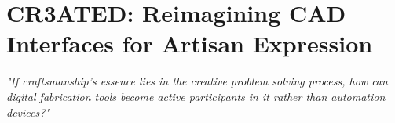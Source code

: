 \section{CR3ATED: Reimagining CAD Interfaces for Artisan Expression}
\textit{"If craftsmanship's essence lies in the creative problem solving process, how can digital fabrication tools become active participants in it rather than automation devices?"}

\vspace{0.5cm}














